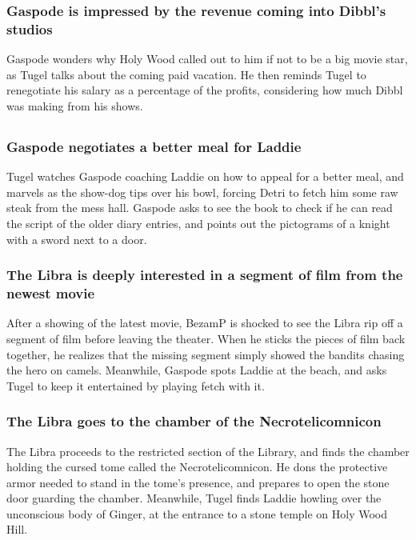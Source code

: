 \subsubsection{\Gls{Gaspode} is impressed by the revenue coming into \Gls{Dibbl}'s studios}
\Gls{Gaspode} wonders why Holy Wood called out to him if not to be a big movie star, as \Gls{Tugel}
talks about the coming paid vacation. He then reminds \Gls{Tugel} to renegotiate his salary as a
percentage of the profits, considering how much \Gls{Dibbl} was making from his shows.

\subsection{}
\subsubsection{\Gls{Gaspode} negotiates a better meal for \Gls{Laddie}}
\Gls{Tugel} watches \Gls{Gaspode} coaching \Gls{Laddie} on how to appeal for a better meal, and
marvels as the show-dog tips over his bowl, forcing \Gls{Detri} to fetch him some raw steak from
the mess hall. \Gls{Gaspode} asks to see the book to check if he can read the script of the older
diary entries, and points out the pictograms of a knight with a sword next to a door.

\subsubsection{The \Gls{Libra} is deeply interested in a segment of film from the newest movie}
After a showing of the latest movie, \Gls{BezamP} is shocked to see the \Gls{Libra} rip off a
segment of film before leaving the theater. When he sticks the pieces of film back together, he
realizes that the missing segment simply showed the bandits chasing the hero on camels. Meanwhile,
\Gls{Gaspode} spots \Gls{Laddie} at the beach, and asks \Gls{Tugel} to keep it entertained by
playing fetch with it.

\subsubsection{The \Gls{Libra} goes to the chamber of the Necrotelicomnicon}
The \Gls{Libra} proceeds to the restricted section of the Library, and finds the chamber holding
the cursed tome called the Necrotelicomnicon. He dons the protective armor needed to stand in
the tome's presence, and prepares to open the stone door guarding the chamber. Meanwhile,
\Gls{Tugel} finds \Gls{Laddie} howling over the unconscious body of \Gls{Ginger}, at the entrance
to a stone temple on Holy Wood Hill.

